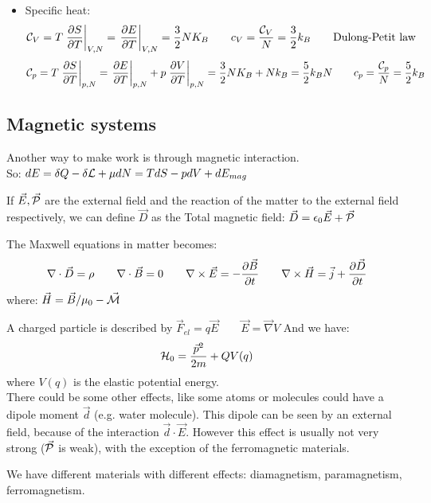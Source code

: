 \begin{itemize}
    \item Specific heat: 
    $$\mathcal{C}_V = T \left.\frac{\partial S}{\partial T}\right|_{V,N} = \left.\frac{\partial E}{\partial T}\right|_{V,N} = \frac 32 NK_B \qquad c_V = \frac {\mathcal{C}_V}N = \frac 32k_B \qquad \text{Dulong-Petit law}$$
    $$\mathcal{C}_p = T \left.\frac{\partial S}{\partial T}\right|_{p,N} = \left.\frac{\partial E}{\partial T}\right|_{p,N} + p\left.\frac{\partial V}{\partial T}\right|_{p,N} = \frac 32 NK_B + Nk_B = \frac52k_BN \qquad c_p = \frac {\mathcal{C}_p}N = \frac 52k_B$$
\end{itemize}

\subsection{Magnetic systems}
Another way to make work is through magnetic interaction.\\ So: $dE = \delta Q -\delta\mathcal{L} + \mu dN = TdS - pdV + dE_{mag}$

If $\vec E, \vec{\mathcal{P}}$ are the external field and the reaction of the matter to the external field respectively, we can define $\vec D$ as the Total magnetic field: $\vec D = \epsilon_0 \vec E + \vec{\mathcal{P}}$\\

The Maxwell equations in matter becomes:
$$ \nabla \cdot \vec D = \rho \qquad \nabla \cdot \vec B = 0 \qquad \nabla \times \vec E = -\frac{\partial\vec B}{\partial t} \qquad \nabla \times \vec H = \vec j + \frac{\partial\vec D}{\partial t}$$
where: $\vec H = \vec B / \mu_0 - \vec {\mathcal{M}}$

A charged particle is described by $\vec F_{el} = q\vec E \qquad \vec E = \vec \nabla V$
And we have:
$$\mathcal{H}_0 = \frac{\vec p^2}{2m} + QV(q)$$
where $V(q)$ is the elastic potential energy.\\

There could be some other effects, like some atoms or molecules could have a dipole moment $\vec d$ (e.g. water molecule). This dipole can be seen by an external field, because of the interaction $\vec d \cdot \vec E$. However this effect is usually not very strong ($\vec{\mathcal{P}}$ is weak), with the exception of the ferromagnetic materials.

We have different materials with different effects: diamagnetism, paramagnetism, ferromagnetism.\\

